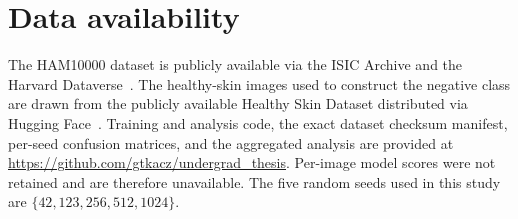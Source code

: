 \documentclass[preprint,review,12pt]{elsarticle}
\begin{document}
\section*{Data availability}
The HAM10000 dataset is publicly available via the ISIC Archive and the Harvard Dataverse~\cite{Tschandl2018}. The healthy-skin images used to construct the negative class are drawn from the publicly available Healthy Skin Dataset distributed via Hugging Face~\cite{megpaulson_healthy_skin}. Training and analysis code, the exact dataset checksum manifest, per-seed confusion matrices, and the aggregated analysis are provided at \url{https://github.com/gtkacz/undergrad_thesis}. Per-image model scores were not retained and are therefore unavailable. The five random seeds used in this study are $\{42, 123, 256, 512, 1024\}$.



\end{document}

